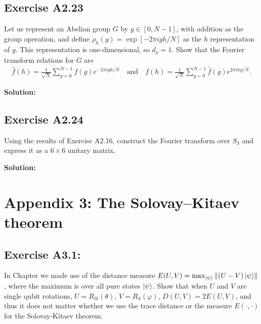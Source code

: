 \documentclass{book}
\begin{document}
\section*{Exercise A2.23}
    Let us represent an Abelian group $G$ by $g\in [0,N-1]$, with addition as the group operation, and define $\rho_h(g) = \exp[-2\pi i gh/N]$ as the $h$ representation of $g$. This representation is one-dimensional, so $d_\rho = 1$. Show that the Fourier transform relations for $G$ are 
    \begin{align}
        \hat{f}(h)= \frac{1}{\sqrt{N}} \sum_{g=0}^{N-1} f(g) e^{-2\pi i g h/N} \quad \text{and} \quad f(h)= \frac{1}{\sqrt{N}} \sum_{g=0}^{N-1} \hat{f}(g) e^{2\pi i h g/N}.
    \end{align}
    
    \textbf{Solution:}
    
\section*{Exercise A2.24}
    Using the results of Exercise A2.16, construct the Fourier transform over $S_3$ and express it as a $6\times6$ unitary matrix.
    
    \textbf{Solution:}


\chapter*{Appendix 3: The Solovay–Kitaev theorem}

\section*{Exercise A3.1:} 
    In Chapter we made use of the distance measure $E(U,V)=\max_{\ket{\psi}}\norm{(U-V)\ket{\psi}}$, where the maximum is over all pure states $\ket{\psi}$. Show that when $U$ and $V$ are single qubit rotations, $U = R_{\hat{m}}(\theta)$, $V = R_{\hat{n}}(\varphi)$, $D(U,V) = 2 E(U,V)$, and thus it does not matter whether we use the trace distance or the measure $E(\cdot, \cdot)$ for the Solovay-Kitaev theorem.
    
\end{document}
